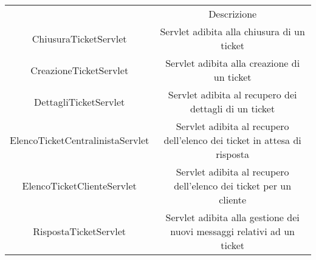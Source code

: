 \documentclass[12pt,a4paper]{article}
\begin{document}
\begin{center}
\begin{tabular}{|c|c|}
\hline
\rowcolor[HTML]{C0C0C0} 
\multicolumn{2}{|c|}{\cellcolor[HTML]{C0C0C0}Ticket} \\ \hline
\rowcolor[HTML]{C0C0C0}  \multicolumn{1}{|c|}{\cellcolor[HTML]{C0C0C0}Classe}  &  Descrizione \\ \hline

ChiusuraTicketServlet & \begin{minipage}{10cm} \vspace{5pt}
Servlet adibita alla chiusura di un ticket \vspace{5pt}
\end{minipage} \\ \hline

CreazioneTicketServlet & \begin{minipage}{10cm} \vspace{5pt}
Servlet adibita alla creazione di un ticket \vspace{5pt}
\end{minipage} \\ \hline

DettagliTicketServlet & \begin{minipage}{10cm} \vspace{5pt}
Servlet adibita al recupero dei dettagli di un ticket \vspace{5pt}
\end{minipage} \\ \hline

ElencoTicketCentralinistaServlet & \begin{minipage}{10cm} \vspace{5pt}
Servlet adibita al recupero dell'elenco dei ticket in attesa di risposta \vspace{5pt}
\end{minipage} \\ \hline

ElencoTicketClienteServlet & \begin{minipage}{10cm} \vspace{5pt}
Servlet adibita al recupero dell'elenco dei ticket per un cliente \vspace{5pt}
\end{minipage} \\ \hline

RispostaTicketServlet & \begin{minipage}{10cm} \vspace{5pt}
Servlet adibita alla gestione dei nuovi messaggi relativi ad un ticket \vspace{5pt}
\end{minipage} \\ \hline

\end{tabular}
\end{center}
\end{document}
